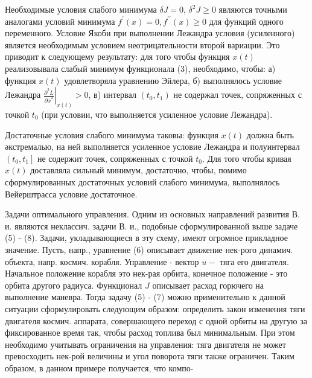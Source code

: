 \documentclass[10pt]{article}
\begin{document}
Необходимые условия слабого минимума $\delta J=0$, $\delta^{2} J \geqslant 0$ являются точными аналогами условий минимума $f^{\prime}(x)=0, f^{\prime \prime}(x) \geqslant 0$ для функций одного переменного. Условие Якоби при выполнении Лежандра условия (усиленного) является необходимым условием неотрицательности второй вариации. Это приводит к следующему результату: для того чтобы функция $x(t)$ реализовывала слабый минимум функционала (3), необходимо, чтобы: а) функция $x(t)$ удовлетворяла уравнению Эйлера, б) выполнялось условие Лежандра $\left.\frac{\partial^{2} L}{\partial \dot{x}^{2}}\right|_{x(t)}>0$, в) интервал $\left(t_{0}, t_{1}\right)$ не содержал точек, сопряженных с точкой $t_{0}$ (при условии, что выполняется усиленное условие Лежандра).



Достаточные условия слабого минимума таковы: функция $x(t)$ должна быть әкстремалью, на ней выполняется усиленное условие Лежандра и полуинтервал $\left(t_{0}, t_{1}\right]$ не содержит точек, сопряженных с точкой $t_{0}$. Для того чтобы кривая $x(t)$ доставляла сильный минимум, достаточно, чтобы, помимо сформулированных достаточных условий слабого минимума, выполнялось Вейерштрасса условие достаточное.



Задачи оптимального управления. Одним из основных направлений развития В. и. являются неклассич. задачи В. и., подобные сформулированной выше задаче (5) - (8). Задачи, укладывающиеся в эту схему, имеют огромное прикладное значение. Пусть, напр., уравнение (6) описывает движение нек-рого динамич. объекта, напр. космич. корабля. Управление - вектор $u-$ тяга его двигателя. Начальное положение корабля это нек-рая орбита, конечное положение - это орбита другого радиуса. Функционал $J$ описывает расход горючего на выполнение маневра. Тогда задачу (5) - (7) можно применительно к данной ситуации сформулировать следующим образом: определить закон изменения тяги двигателя космич. аппарата, совершающего переход с одной орбиты на другую за фиксированное время так, чтобы расход топлива был минимальным. При этом необходимо учитывать ограничения на управления: тяга двигателя не может превосходить нек-рой величины и угол поворота тяги также ограничен. Таким образом, в данном примере получается, что компо-
\end{document}
